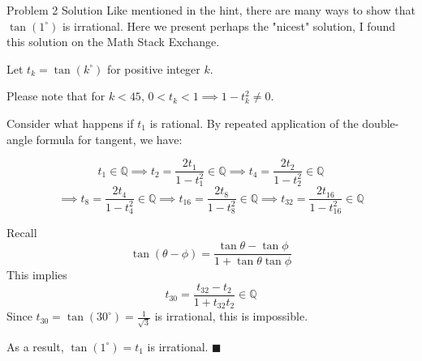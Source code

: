 \documentclass{article}
\begin{document}
\begin{solution}{Problem 2 Solution}
Like mentioned in the hint, there are many ways to show that $\tan(1^{\circ})$ is irrational. Here we present perhaps the "nicest" solution, I found this solution on
the Math Stack Exchange. \vspace{0.2cm}

Let \( t_k = \tan(k^\circ) \) for positive integer \( k \).

\vspace{1em}

Please note that for \( k < 45 \), \( 0 < t_k < 1 \implies 1 - t_k^2 \neq 0 \).

\vspace{1em}

Consider what happens if \( t_1 \) is rational. By repeated application of the double-angle formula for tangent, we have:

\[
t_1 \in \mathbb{Q} \implies
t_2 = \frac{2t_1}{1 - t_1^2} \in \mathbb{Q} \implies
t_4 = \frac{2t_2}{1 - t_2^2} \in \mathbb{Q}
\]
\[
\implies t_8 = \frac{2t_4}{1 - t_4^2} \in \mathbb{Q} \implies
t_{16} = \frac{2t_8}{1 - t_8^2} \in \mathbb{Q} \implies
t_{32} = \frac{2t_{16}}{1 - t_{16}^2} \in \mathbb{Q}
\]

\vspace{1em}

Recall
\[
\tan(\theta - \phi) = \frac{\tan \theta - \tan \phi}{1 + \tan \theta \tan \phi}
\]
This implies
\[
t_{30} = \frac{t_{32} - t_2}{1 + t_{32} t_2} \in \mathbb{Q}
\]
Since \( t_{30} = \tan(30^\circ) = \frac{1}{\sqrt{3}} \) is irrational, this is impossible.

\vspace{1em}

As a result, \( \tan(1^\circ) = t_1 \) is irrational.
$\blacksquare$
\end{solution}

\vspace{0.7cm}
\end{document}
